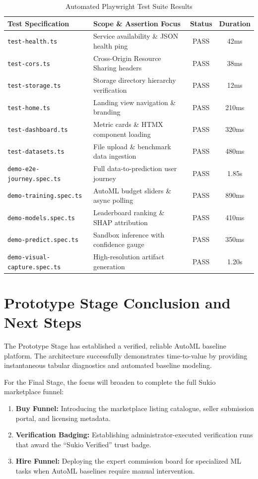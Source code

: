 ﻿\documentclass[11pt,a4paper]{article}
\begin{document}
\begin{table}[H]
\centering
\begin{tabular}{llcc}
\toprule
\textbf{Test Specification} & \textbf{Scope \& Assertion Focus} & \textbf{Status} & \textbf{Duration} \\
\midrule
\texttt{test-health.ts} & Service availability \& JSON health ping & PASS & 42ms \\
\texttt{test-cors.ts} & Cross-Origin Resource Sharing headers & PASS & 38ms \\
\texttt{test-storage.ts} & Storage directory hierarchy verification & PASS & 12ms \\
\texttt{test-home.ts} & Landing view navigation \& branding & PASS & 210ms \\
\texttt{test-dashboard.ts} & Metric cards \& HTMX component loading & PASS & 320ms \\
\texttt{test-datasets.ts} & File upload \& benchmark data ingestion & PASS & 480ms \\
\texttt{demo-e2e-journey.spec.ts} & Full data-to-prediction user journey & PASS & 1.85s \\
\texttt{demo-training.spec.ts} & AutoML budget sliders \& async polling & PASS & 890ms \\
\texttt{demo-models.spec.ts} & Leaderboard ranking \& SHAP attribution & PASS & 410ms \\
\texttt{demo-predict.spec.ts} & Sandbox inference with confidence gauge & PASS & 350ms \\
\texttt{demo-visual-capture.spec.ts} & High-resolution artifact generation & PASS & 1.20s \\
\bottomrule
\end{tabular}
\caption{Automated Playwright Test Suite Results}
\label{tab:playwright_results}
\end{table}

\section{Prototype Stage Conclusion and Next Steps}
The Prototype Stage has established a verified, reliable AutoML baseline platform. The architecture successfully demonstrates time-to-value by providing instantaneous tabular diagnostics and automated baseline modeling. 

For the Final Stage, the focus will broaden to complete the full Sukio marketplace funnel:
\begin{enumerate}[leftmargin=0.7cm]
  \item \textbf{Buy Funnel:} Introducing the marketplace listing catalogue, seller submission portal, and licensing metadata.
  \item \textbf{Verification Badging:} Establishing administrator-executed verification runs that award the ``Sukio Verified'' trust badge.
  \item \textbf{Hire Funnel:} Deploying the expert commission board for specialized ML tasks when AutoML baselines require manual intervention.
\end{enumerate}
\end{document}
